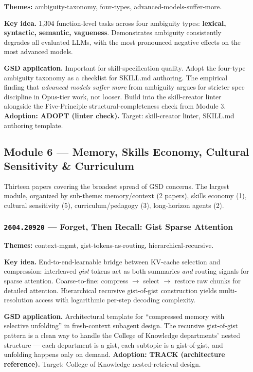 \documentclass[11pt,letterpaper]{article}
\newcommand{\arxivid}[1]{\texttt{\textcolor{accent}{#1}}}
\newcommand{\paperhead}[2]{\noindent\textbf{\sffamily\textcolor{secondary}{#1}} \textemdash{} #2}
\begin{document}
\paperhead{Themes:}{ambiguity-taxonomy, four-types, advanced-models-suffer-more.}

\textbf{Key idea.} 1,304 function-level tasks across four ambiguity types: \textbf{lexical, syntactic, semantic, vagueness}. Demonstrates ambiguity consistently degrades all evaluated LLMs, with the most pronounced negative effects on the most advanced models.

\textbf{GSD application.} Important for skill-specification quality. Adopt the four-type ambiguity taxonomy as a checklist for SKILL.md authoring. The empirical finding that \textit{advanced models suffer more} from ambiguity argues for stricter spec discipline in Opus-tier work, not looser. Build into the skill-creator linter alongside the Five-Principle structural-completeness check from Module 3. \textbf{Adoption: ADOPT (linter check).} Target: skill-creator linter, SKILL.md authoring template.

\subsection{Module 6 --- Memory, Skills Economy, Cultural Sensitivity \& Curriculum}

Thirteen papers covering the broadest spread of GSD concerns. The largest module, organized by sub-theme: memory/context (2 papers), skills economy (1), cultural sensitivity (5), curriculum/pedagogy (3), long-horizon agents (2).

\subsubsection{\arxivid{2604.20920} --- Forget, Then Recall: Gist Sparse Attention}

\paperhead{Themes:}{context-mgmt, gist-tokens-as-routing, hierarchical-recursive.}

\textbf{Key idea.} End-to-end-learnable bridge between KV-cache selection and compression: interleaved \textit{gist} tokens act as both summaries \textit{and} routing signals for sparse attention. Coarse-to-fine: compress $\to$ select $\to$ restore raw chunks for detailed attention. Hierarchical recursive gist-of-gist construction yields multi-resolution access with logarithmic per-step decoding complexity.

\textbf{GSD application.} Architectural template for ``compressed memory with selective unfolding'' in fresh-context subagent design. The recursive gist-of-gist pattern is a clean way to handle the College of Knowledge departments' nested structure --- each department is a gist, each subtopic is a gist-of-gist, and unfolding happens only on demand. \textbf{Adoption: TRACK (architecture reference).} Target: College of Knowledge nested-retrieval design.
\end{document}
